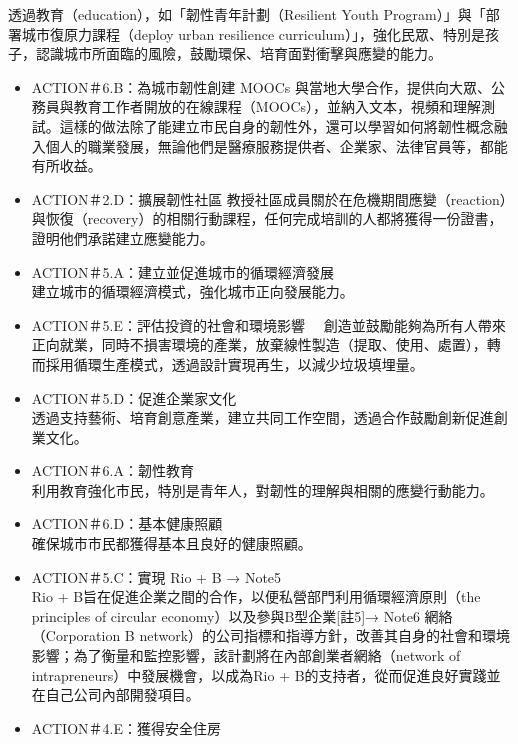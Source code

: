 \documentclass[a4paper,12pt]{article}
\begin{document}
\begin{enumerate}
\begin{enumerate}
\begin{enumerate}
透過教育（education），如「韌性青年計劃（Resilient Youth Program）」與「部署城市復原力課程（deploy urban resilience curriculum）」，強化民眾、特別是孩子，認識城市所面臨的風險，鼓勵環保、培育面對衝擊與應變的能力。\\
\begin{itemize}
\item ACTION＃6.B：為城市韌性創建 MOOCs  與當地大學合作，提供向大眾、公務員與教育工作者開放的在線課程（MOOCs），並納入文本，視頻和理解測試。這樣的做法除了能建立市民自身的韌性外，還可以學習如何將韌性概念融入個人的職業發展，無論他們是醫療服務提供者、企業家、法律官員等，都能有所收益。\\
\item ACTION＃2.D：擴展韌性社區  教授社區成員關於在危機期間應變（reaction）與恢復（recovery）的相關行動課程，任何完成培訓的人都將獲得一份證書，證明他們承諾建立應變能力。\\
\item ACTION＃5.A：建立並促進城市的循環經濟發展\\
建立城市的循環經濟模式，強化城市正向發展能力。\\
\item ACTION＃5.E：評估投資的社會和環境影響　  創造並鼓勵能夠為所有人帶來正向就業，同時不損害環境的產業，放棄線性製造（提取、使用、處置），轉而採用循環生產模式，透過設計實現再生，以減少垃圾填埋量。\\
\item ACTION＃5.D：促進企業家文化\\
透過支持藝術、培育創意產業，建立共同工作空間，透過合作鼓勵創新促進創業文化。\\
\item ACTION＃6.A：韌性教育\\
利用教育強化市民，特別是青年人，對韌性的理解與相關的應變行動能力。\\
\item ACTION＃6.D：基本健康照顧\\
確保城市市民都獲得基本且良好的健康照顧。\\
\item ACTION＃5.C：實現 Rio + B → Note5\\
Rio + B旨在促進企業之間的合作，以便私營部門利用循環經濟原則（the principles of circular economy）以及參與B型企業[註5]→ Note6 網絡（Corporation B network）的公司指標和指導方針，改善其自身的社會和環境影響；為了衡量和監控影響，該計劃將在內部創業者網絡（network of intrapreneurs）中發展機會，以成為Rio + B的支持者，從而促進良好實踐並在自己公司內部開發項目。\\
\item ACTION＃4.E：獲得安全住房\\

\end{itemize}
\end{enumerate}
\end{enumerate}
\end{enumerate}
\end{document}
